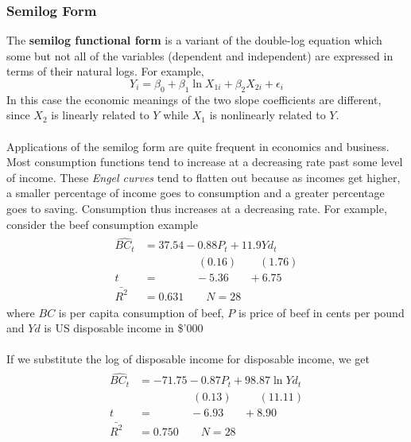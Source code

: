 \documentclass[11pt]{article}
\begin{document}
\subsubsection{Semilog Form}
The \textbf{semilog functional form} is a variant of the double-log equation which some but not all of the variables (dependent and independent) are expressed in terms of their natural logs. For example, 
\begin{equation}
Y_i = \beta_0 + \beta_1 \ln X_{1i} + \beta_2 X_{2i} + \epsilon_i \label{eg7_7}
\end{equation}
In this case the economic meanings of the two slope coefficients are different, since $X_2$ is linearly related to $Y$ while $X_1$ is nonlinearly related to $Y$.\\ \\
Applications of the semilog form are quite frequent in economics and business. Most consumption functions tend to increase at a decreasing rate past some level of income. These \textit{Engel curves} tend to flatten out because as incomes get higher, a smaller percentage of income goes to consumption and a greater percentage goes to saving. Consumption thus increases at a decreasing rate. For example, consider the beef consumption example
\begin{align*}
\begin{split}
\widehat{BC_t} &= 37.54 - {0.88P_t} + {11.9Yd_t}\\
&\>\>\>\>\>\>\>\>\>\>\>\>\>\>\>\>\>\>\>\>\>\> (0.16) 
\>\>\>\>\>\>\>\>\> (1.76)\\
t&=\>\>\>\>\>\>\>\>\>\>\>\>\>\>\> -5.36 
\>\>\>\>\>\>\>\> +6.75\\
\bar{R^2}&= 0.631 \quad\quad N=28
\end{split}
\end{align*}
where $BC$ is per capita consumption of beef, $P$ is price of beef in cents per pound and $Yd$ is US disposable income in \$'000\\ \\
If we substitute the log of disposable income for disposable income, we get
\begin{align} \label{eg7_8}
\begin{split}
\widehat{BC_t} &= -71.75 - {0.87P_t} + {98.87\ln Yd_t}\\
&\>\>\>\>\>\>\>\>\>\>\>\>\>\>\>\>\>\>\>\>\>\> (0.13) 
\>\>\>\>\>\>\>\>\>\>\> (11.11)\\
t&=\>\>\>\>\>\>\>\>\>\>\>\>\>\>\> -6.93 
\>\>\>\>\>\>\>\> +8.90\\
\bar{R^2}&= 0.750 \quad\quad N=28
\end{split}
\end{align}
\end{document}
